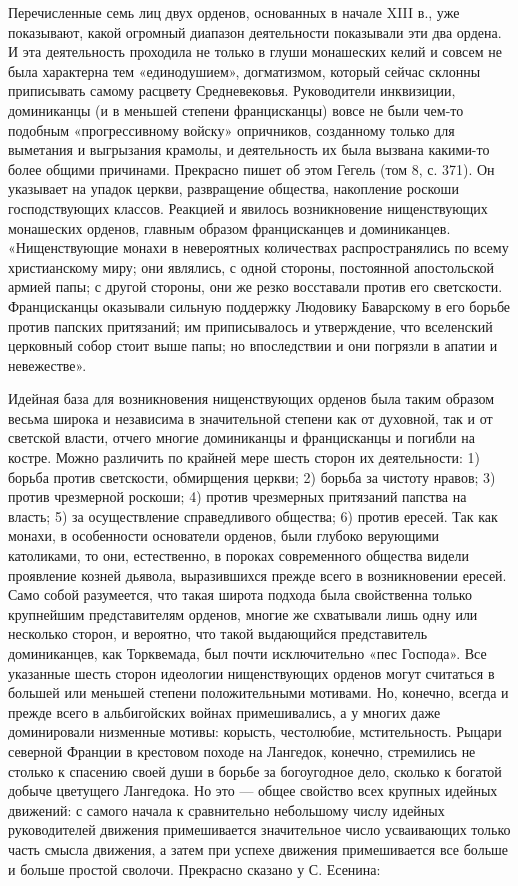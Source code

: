 Перечисленные семь лиц двух орденов, основанных в начале XIII в., уже
показывают, какой огромный диапазон деятельности показывали эти два ордена. И
эта деятельность проходила не только в глуши монашеских келий и совсем не была
характерна тем «единодушием», догматизмом, который сейчас склонны приписывать
самому расцвету Средневековья. Руководители инквизиции, доминиканцы (и в
меньшей степени францисканцы) вовсе не были чем-то подобным «прогрессивному
войску» опричников, созданному только для выметания и выгрызания крамолы, и
деятельность их была вызвана какими-то более общими причинами. Прекрасно пишет
об этом Гегель (том 8, с. 371). Он указывает на упадок церкви, развращение
общества, накопление роскоши господствующих классов. Реакцией и явилось
возникновение нищенствующих монашеских орденов, главным образом францисканцев и
доминиканцев. «Нищенствующие монахи в невероятных количествах распространялись
по всему христианскому миру; они являлись, с одной стороны, постоянной
апостольской армией папы; с другой стороны, они же резко восставали против его
светскости. Францисканцы оказывали сильную поддержку Людовику Баварскому в его
борьбе против папских притязаний; им приписывалось и утверждение, что
вселенский церковный собор стоит выше папы; но впоследствии и они погрязли в
апатии и невежестве».

Идейная база для возникновения нищенствующих орденов была таким образом весьма
широка и независима в значительной степени как от духовной, так и от светской
власти, отчего многие доминиканцы и францисканцы и погибли на костре. Можно
различить по крайней мере шесть сторон их деятельности: 1) борьба против
светскости, обмирщения церкви; 2) борьба за чистоту нравов; 3) против
чрезмерной роскоши; 4) против чрезмерных притязаний папства на власть; 5) за
осуществление справедливого общества; 6) против ересей. Так как монахи, в
особенности основатели орденов, были глубоко верующими католиками, то они,
естественно, в пороках современного общества видели проявление козней дьявола,
выразившихся прежде всего в возникновении ересей. Само собой разумеется, что
такая широта подхода была свойственна только крупнейшим представителям орденов,
многие же схватывали лишь одну или несколько сторон, и вероятно, что такой
выдающийся представитель доминиканцев, как Торквемада, был почти исключительно
«пес Господа». Все указанные шесть сторон идеологии нищенствующих орденов могут
считаться в большей или меньшей степени положительными мотивами. Но, конечно,
всегда и прежде всего в альбигойских войнах примешивались, а у многих даже
доминировали низменные мотивы: корысть, честолюбие, мстительность. Рыцари
северной Франции в крестовом походе на Лангедок, конечно, стремились не столько
к спасению своей души в борьбе за богоугодное дело, сколько к богатой добыче
цветущего Лангедока. Но это --- общее свойство всех крупных идейных движений: с
самого начала к сравнительно небольшому числу идейных руководителей движения
примешивается значительное число усваивающих только часть смысла
движения, а затем при успехе движения примешивается все больше и больше простой
сволочи. Прекрасно сказано у С. Есенина:

